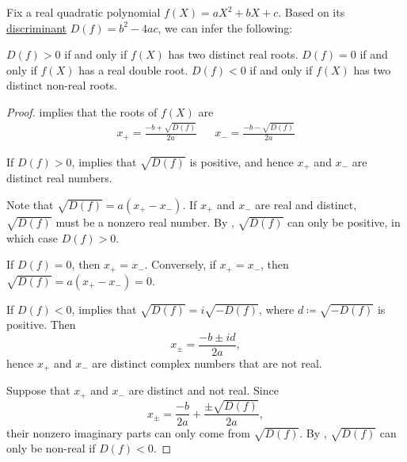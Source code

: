 \begin{corollary}\label{thm:real_quadratic_discriminant}
  Fix a real quadratic polynomial \( f(X) = a X^2 + b X + c \). Based on its \hyperref[def:discriminant]{discriminant} \( D(f) = b^2 - 4ac \), we can infer the following:
  \begin{thmenum}
     \( D(f) > 0 \) if and only if \( f(X) \) has two distinct real roots.
     \( D(f) = 0 \) if and only if \( f(X) \) has a real double root.
     \( D(f) < 0 \) if and only if \( f(X) \) has two distinct non-real roots.
  \end{thmenum}
\end{corollary}
\begin{proof}
   implies that the roots of \( f(X) \) are
  \begin{align*}
    x_+ = \frac {-b + \sqrt{D(f)}} {2a}
    &&
    x_- = \frac {-b - \sqrt{D(f)}} {2a}
  \end{align*}

  \SufficiencySubProof* If \( D(f) > 0 \),  implies that \( \sqrt{D(f)} \) is positive, and hence \( x_+ \) and \( x_- \) are distinct real numbers.

  \NecessitySubProof* Note that \( \sqrt{D(f)} = a (x_+ - x_-) \). If \( x_+ \) and \( x_- \) are real and distinct, \( \sqrt{D(f)} \) must be a nonzero real number. By , \( \sqrt{D(f)} \) can only be positive, in which case \( D(f) > 0 \).

  \SufficiencySubProof* If \( D(f) = 0 \), then \( x_+ = x_- \).
  \NecessitySubProof* Conversely, if \( x_+ = x_- \), then \( \sqrt{D(f)} = a(x_+ - x_-) = 0 \).

  \SufficiencySubProof* If \( D(f) < 0 \),  implies that \( \sqrt{D(f)} = i \sqrt{-D(f)} \), where \( d \coloneqq \sqrt{-D(f)} \) is positive. Then
  \begin{equation*}
    x_\pm = \frac {-b \pm i d} {2a},
  \end{equation*}
  hence \( x_+ \) and \( x_- \) are distinct complex numbers that are not real.

  \NecessitySubProof Suppose that \( x_+ \) and \( x_- \) are distinct and not real. Since
  \begin{equation*}
    x_\pm = \frac {-b} {2a} + \frac {\pm \sqrt{D(f)}} {2a},
  \end{equation*}
  their nonzero imaginary parts can only come from \( \sqrt{D(f)} \). By , \( \sqrt{D(f)} \) can only be non-real if \( D(f) < 0 \).
\end{proof}

